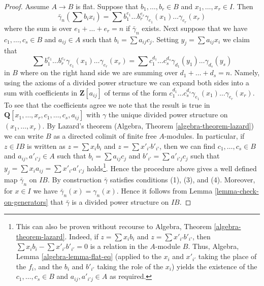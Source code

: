 \documentclass{stacks-project}
\theoremstyle{plain}
\theoremstyle{definition}
\theoremstyle{remark}
\numberwithin{equation}{subsection}
\begin{document}
\begin{proof}
\medskip\noindent
Assume $A \to B$ is flat. Suppose that $b_1, \ldots, b_r \in B$ and
$x_1, \ldots, x_r \in I$. Then
$$
\bar\gamma_n(\sum b_ix_i) =
\sum b_1^{e_1} \ldots b_r^{e_r} \gamma_{e_1}(x_1) \ldots \gamma_{e_r}(x_r)
$$
where the sum is over $e_1 + \ldots + e_r = n$
if $\bar\gamma_n$ exists. Next suppose that we have $c_1, \ldots, c_s \in B$
and $a_{ij} \in A$ such that $b_i = \sum a_{ij}c_j$.
Setting $y_j = \sum a_{ij}x_i$ we claim that
$$
\sum b_1^{e_1} \ldots b_r^{e_r} \gamma_{e_1}(x_1) \ldots \gamma_{e_r}(x_r) =
\sum c_1^{d_1} \ldots c_s^{d_s} \gamma_{d_1}(y_1) \ldots \gamma_{d_s}(y_s)
$$
in $B$ where on the right hand side we are summing over
$d_1 + \ldots + d_s = n$. Namely, using the axioms of a divided power
structure we can expand both sides into a sum with coefficients
in $\mathbf{Z}[a_{ij}]$ of terms of the form
$c_1^{d_1} \ldots c_s^{d_s}\gamma_{e_1}(x_1) \ldots \gamma_{e_r}(x_r)$.
To see that the coefficients agree we note that the result is true
in $\mathbf{Q}[x_1, \ldots, x_r, c_1, \ldots, c_s, a_{ij}]$ with
$\gamma$ the unique divided power structure on $(x_1, \ldots, x_r)$.
By Lazard's theorem (Algebra, Theorem \ref{algebra-theorem-lazard})
we can write $B$ as a directed colimit of finite free $A$-modules.
In particular, if $z \in IB$ is written as $z = \sum x_ib_i$ and
$z = \sum x'_{i'}b'_{i'}$, then we can find $c_1, \ldots, c_s \in B$
and $a_{ij}, a'_{i'j} \in A$ such that $b_i = \sum a_{ij}c_j$
and $b'_{i'} = \sum a'_{i'j}c_j$ such that
$y_j = \sum x_ia_{ij} = \sum x'_{i'}a'_{i'j}$ holds\footnote{This
can also be proven without recourse to
Algebra, Theorem \ref{algebra-theorem-lazard}. Indeed, if
$z = \sum x_ib_i$ and $z = \sum x'_{i'}b'_{i'}$, then
$\sum x_ib_i - \sum x'_{i'}b'_{i'} = 0$ is a relation in the
$A$-module $B$. Thus, Algebra, Lemma \ref{algebra-lemma-flat-eq}
(applied to the $x_i$ and $x'_{i'}$ taking the place of the $f_i$,
and the $b_i$ and $b'_{i'}$ taking the role of the $x_i$) yields
the existence of the $c_1, \ldots, c_s \in B$
and $a_{ij}, a'_{i'j} \in A$ as required.}.
Hence the procedure above gives a well defined map $\bar\gamma_n$
on $IB$. By construction $\bar\gamma$ satisfies conditions (1), (3), and
(4). Moreover, for $x \in I$ we have $\bar\gamma_n(x) = \gamma_n(x)$. Hence
it follows from Lemma \ref{lemma-check-on-generators} that $\bar\gamma$
is a divided power structure on $IB$.
\end{proof}
\end{document}
